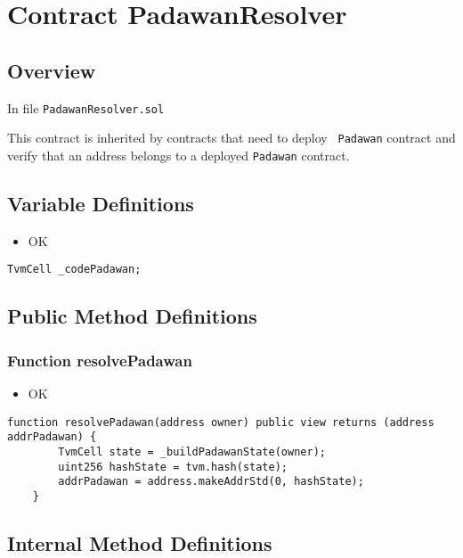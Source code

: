 
\chapter{Contract PadawanResolver}

\minitoc

\section{Overview}

In file {\tt PadawanResolver.sol}

This contract is inherited by contracts that need to deploy {\tt
  Padawan} contract and verify that an address belongs to a deployed
{\tt Padawan} contract.

\section{Variable Definitions}

\begin{itemize}
\item OK
\end{itemize}

\begin{lstlisting}[firstnumber=8]
    TvmCell _codePadawan;
\end{lstlisting}

\section{Public Method Definitions}


\subsection{Function resolvePadawan}

\begin{itemize}
\item OK
\end{itemize}

\begin{lstlisting}[firstnumber=10]
    function resolvePadawan(address owner) public view returns (address addrPadawan) {
        TvmCell state = _buildPadawanState(owner);
        uint256 hashState = tvm.hash(state);
        addrPadawan = address.makeAddrStd(0, hashState);
    }
\end{lstlisting}

\section{Internal Method Definitions}



